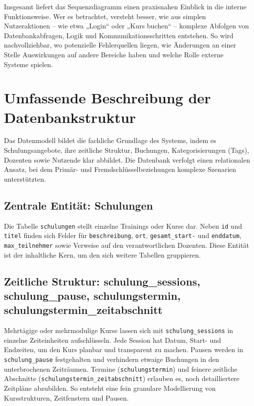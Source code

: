 Insgesamt liefert das Sequenzdiagramm einen praxisnahen Einblick in die interne Funktionsweise. Wer es betrachtet, versteht besser, wie aus simplen Nutzeraktionen – wie etwa „Login“ oder „Kurs buchen“ – komplexe Abfolgen von Datenbankabfragen, Logik und Kommunikationsschritten entstehen. So wird nachvollziehbar, wo potenzielle Fehlerquellen liegen, wie Änderungen an einer Stelle Auswirkungen auf andere Bereiche haben und welche Rolle externe Systeme spielen.

\chapter{Umfassende Beschreibung der Datenbankstruktur}
Das Datenmodell bildet die fachliche Grundlage des Systems, indem es Schulungsangebote, ihre zeitliche Struktur, Buchungen, Kategorisierungen (Tags), Dozenten sowie Nutzende klar abbildet. Die Datenbank verfolgt einen relationalen Ansatz, bei dem Primär- und Fremdschlüsselbeziehungen komplexe Szenarien unterstützten.

\section{Zentrale Entität: Schulungen}
Die Tabelle \texttt{schulungen} stellt einzelne Trainings oder Kurse dar. Neben \texttt{id} und \texttt{titel} finden sich Felder für \texttt{beschreibung}, \texttt{ort}, \texttt{gesamt\_start-} und \texttt{enddatum}, \texttt{max\_teilnehmer} sowie Verweise auf den verantwortlichen Dozenten. Diese Entität ist der inhaltliche Kern, um den sich weitere Tabellen gruppieren.

\section{Zeitliche Struktur: schulung\_sessions, schulung\_pause, schulungstermin, schulungstermin\_zeitabschnitt}
Mehrtägige oder mehrmodulige Kurse lassen sich mit \texttt{schulung\_sessions} in einzelne Zeiteinheiten aufschlüsseln. Jede Session hat Datum, Start- und Endzeiten, um den Kurs planbar und transparent zu machen. Pausen werden in \texttt{schulung\_pause} festgehalten und verhindern etwaige Buchungen in den unterbrochenen Zeiträumen. Termine (\texttt{schulungstermin}) und feinere zeitliche Abschnitte (\texttt{schulungstermin\_zeitabschnitt}) erlauben es, noch detailliertere Zeitpläne abzubilden. So entsteht eine fein granulare Modellierung von Kursstrukturen, Zeitfenstern und Pausen.

